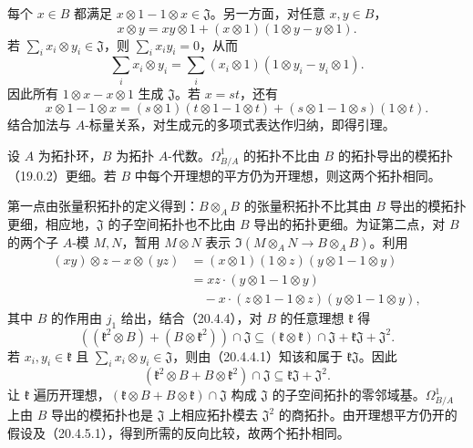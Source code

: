 每个 $x\in B$ 都满足 $x\otimes1-1\otimes x\in\mathfrak J$。另一方面，对任意 $x,y\in B$，
\[
 x\otimes y=xy\otimes1+(x\otimes1)(1\otimes y-y\otimes1).
\]
若 $\sum_i x_i\otimes y_i\in\mathfrak J$，则 $\sum_i x_iy_i=0$，从而
\begin{equation}
 \sum_i x_i\otimes y_i
 =\sum_i(x_i\otimes1)(1\otimes y_i-y_i\otimes1).
 \tag{20.4.4.1}
\end{equation}
因此所有 $1\otimes x-x\otimes1$ 生成 $\mathfrak J$。若 $x=st$，还有
\begin{equation}
 x\otimes1-1\otimes x
 =(s\otimes1)(t\otimes1-1\otimes t)
 +(s\otimes1-1\otimes s)(1\otimes t).
 \tag{20.4.4.2}
\end{equation}
结合加法与 $A$-标量关系，对生成元的多项式表达作归纳，即得引理。

设 $A$ 为拓扑环，$B$ 为拓扑 $A$-代数。$\Omega^1_{B/A}$ 的拓扑不比由 $B$ 的拓扑导出的模拓扑（19.0.2）更细。若 $B$ 中每个开理想的平方仍为开理想，则这两个拓扑相同。

第一点由张量积拓扑的定义得到：$B\otimes_A B$ 的张量积拓扑不比其由 $B$ 导出的模拓扑更细，相应地，$\mathfrak J$ 的子空间拓扑也不比由 $B$ 导出的拓扑更细。为证第二点，对 $B$ 的两个子 $A$-模 $M,N$，暂用 $M\otimes N$ 表示 $\Im(M\otimes_A N\to B\otimes_A B)$。利用
\[
\begin{aligned}
 (xy)\otimes z-x\otimes(yz)
 &=(x\otimes1)(1\otimes z)(y\otimes1-1\otimes y)\\
 &=xz\cdot(y\otimes1-1\otimes y)\\
 &\quad-x\cdot(z\otimes1-1\otimes z)(y\otimes1-1\otimes y),
\end{aligned}
\]
其中 $B$ 的作用由 $j_1$ 给出，结合（20.4.4），对 $B$ 的任意理想 $\mathfrak k$ 得
\[
 ((\mathfrak k^2\otimes B)+(B\otimes\mathfrak k^2))\cap\mathfrak J
 \subseteq(\mathfrak k\otimes\mathfrak k)\cap\mathfrak J
       +\mathfrak k\mathfrak J+\mathfrak J^2.
\]
若 $x_i,y_i\in\mathfrak k$ 且 $\sum_i x_i\otimes y_i\in\mathfrak J$，则由（20.4.4.1）知该和属于 $\mathfrak k\mathfrak J$。因此
\begin{equation}
 (\mathfrak k^2\otimes B+B\otimes\mathfrak k^2)\cap\mathfrak J
 \subseteq\mathfrak k\mathfrak J+\mathfrak J^2.
 \tag{20.4.5.1}
\end{equation}
让 $\mathfrak k$ 遍历开理想，$(\mathfrak k\otimes B+B\otimes\mathfrak k)\cap\mathfrak J$ 构成 $\mathfrak J$ 的子空间拓扑的零邻域基。$\Omega^1_{B/A}$ 上由 $B$ 导出的模拓扑也是 $\mathfrak J$ 上相应拓扑模去 $\mathfrak J^2$ 的商拓扑。由开理想平方仍开的假设及（20.4.5.1），得到所需的反向比较，故两个拓扑相同。

